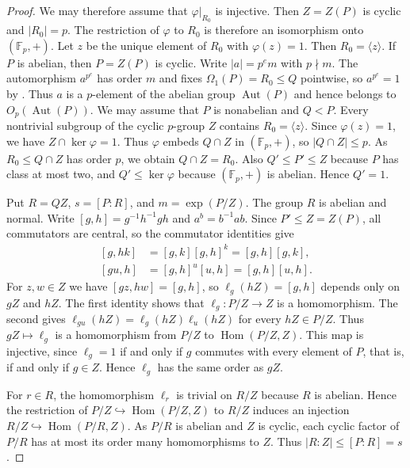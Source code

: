 \documentclass[11pt,a4paper]{article}
\theoremstyle{definition}
\theoremstyle{remark}
\numberwithin{equation}{section}
\newcommand{\Fp}{\mathbb{F}_p}
\DeclareMathOperator{\Aut}{Aut}
\DeclareMathOperator{\Hom}{Hom}
\begin{document}
\begin{proof}
		We may therefore assume that $\varphi|_{R_0}$ is injective.
		Then $Z=Z(P)$ is cyclic and $|R_0|=p$. The restriction of $\varphi$ to
		$R_0$ is therefore an isomorphism onto $(\Fp,+)$. Let $z$ be the unique
		element of $R_0$ with $\varphi(z)=1$. Then $R_0=\langle z\rangle$.
		If $P$ is abelian, then $P=Z(P)$ is cyclic. Write $|a|=p^e m$ with
		$p\nmid m$. The automorphism $a^{p^e}$ has order $m$ and fixes
		$\Omega_1(P)=R_0\le Q$ pointwise, so $a^{p^e}=1$ by
		\cite[Corollary~4.35]{Isaacs2008}. Thus $a$ is a $p$-element of the abelian
		group $\Aut(P)$ and hence belongs to $O_p(\Aut(P))$.
		We may assume that $P$ is nonabelian and $Q<P$.
		Every nontrivial subgroup of the cyclic $p$-group $Z$ contains
		$R_0=\langle z\rangle$. Since $\varphi(z)=1$, we have $Z\cap\ker\varphi=1$.
		Thus $\varphi$ embeds $Q\cap Z$ in $(\Fp,+)$, so $|Q\cap Z|\le p$.
		As $R_0\le Q\cap Z$ has order $p$, we obtain $Q\cap Z=R_0$.
		Also $Q'\le P'\le Z$ because $P$ has class at most two, and
		$Q'\le\ker\varphi$ because $(\Fp,+)$ is abelian. Hence $Q'=1$.
		
		Put $R=QZ$, $s=[P:R]$, and $m=\exp(P/Z)$.
		The group $R$ is abelian and normal.
		Write $[g,h]=g^{-1}h^{-1}gh$ and $a^b=b^{-1}ab$. Since $P'\le Z=Z(P)$,
		all commutators are central, so the commutator identities
		\cite[Lemma~2.11(i)--(ii)]{Craven2008} give
		\[
		\begin{aligned}
			[g,hk]&=[g,k][g,h]^k=[g,h][g,k],\\
			[gu,h]&=[g,h]^u[u,h]=[g,h][u,h].
		\end{aligned}
		\]
		For $z,w\in Z$ we have $[gz,hw]=[g,h]$, so $\ell_g(hZ)=[g,h]$
		depends only on $gZ$ and $hZ$. The first identity shows that
		$\ell_g:P/Z\to Z$ is a homomorphism. The second gives
		$\ell_{gu}(hZ)=\ell_g(hZ)\ell_u(hZ)$ for every $hZ\in P/Z$.
		Thus $gZ\mapsto\ell_g$ is a homomorphism from $P/Z$ to $\Hom(P/Z,Z)$.
		This map is injective, since $\ell_g=1$ if and only if $g$
		commutes with every element of $P$, that is, if and only if $g\in Z$.
		Hence $\ell_g$ has the same order as $gZ$.
		
		For $r\in R$, the homomorphism $\ell_r$ is trivial on $R/Z$
		because $R$ is abelian. Hence the restriction of
		$P/Z\hookrightarrow\Hom(P/Z,Z)$ to $R/Z$ induces an injection
		$R/Z\hookrightarrow\Hom(P/R,Z)$.
		As $P/R$ is abelian and $Z$ is cyclic, each cyclic factor of $P/R$
		has at most its order many homomorphisms to $Z$. Thus $|R:Z|\le [P:R]=s$.
		

\end{proof}
\end{document}
